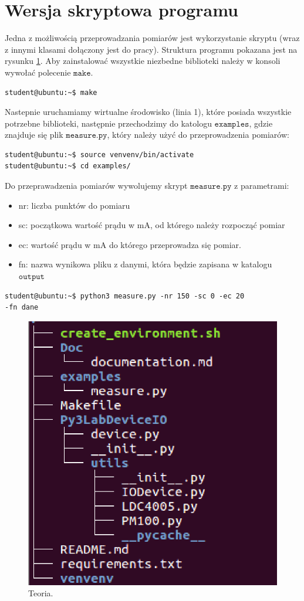 \section{Wersja skryptowa programu}
Jedna z możliwością przeprowadzania pomiarów jest wykorzystanie skryptu (wraz z innymi klasami dołączony jest do pracy).
Struktura programu pokazana jest na rysunku \ref{struktura_rys_1}. Aby zainstalować wszystkie niezbedne biblioteki należy
w konsoli wywołać polecenie $\mathtt{make}$.
\begin{lstlisting}[style=Bash]
student@ubuntu:~$ make
\end{lstlisting}
Nastepnie uruchamiamy wirtualne środowisko (linia 1), które posiada wszystkie potrzebne biblioteki, następnie
przechodzimy do katologu $\mathtt{examples}$, gdzie znajduje się plik $\mathtt{measure.py}$, który należy użyć do
przeprowadzenia pomiarów:
\begin{lstlisting}[style=Bash]
student@ubuntu:~$ source venvenv/bin/activate
student@ubuntu:~$ cd examples/
\end{lstlisting}
Do przeprawadzenia pomiarów wywolujemy skrypt $\mathtt{measure.py}$ z parametrami:
\begin{itemize}
\item nr: liczba punktów do pomiaru
\item sc: początkowa wartość prądu w mA, od którego należy rozpocząć pomiar
\item ec: wartość prądu w mA do którego przeprowadza się pomiar.
\item fn: nazwa wynikowa pliku z danymi, która będzie zapisana w katalogu $\mathtt{output}$
\end{itemize}
\begin{lstlisting}[style=Bash]
student@ubuntu:~$ python3 measure.py -nr 150 -sc 0 -ec 20
-fn dane
\end{lstlisting}
\begin{figure}
\center
  \includegraphics[scale=0.3]{tree.eps}
  \caption{Teoria.}
  \label{struktura_rys_1}
\end{figure}
